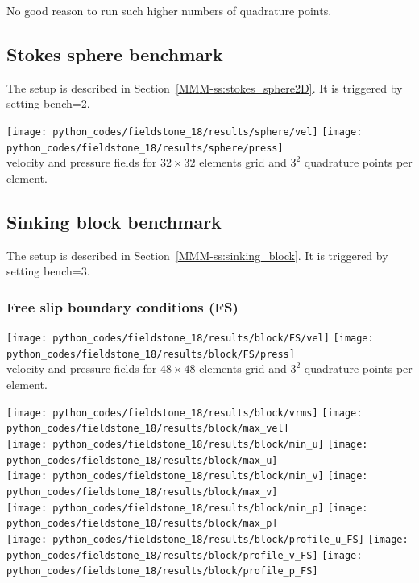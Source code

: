 No good reason to run such higher numbers of quadrature points.


\subsection*{Stokes sphere benchmark}

The setup is described in Section~\ref{MMM-ss:stokes_sphere2D}.
It is triggered by setting {\python bench=2}.

\begin{center}
\texttt{[image: python\_codes/fieldstone\_18/results/sphere/vel]}
\texttt{[image: python\_codes/fieldstone\_18/results/sphere/press]}\\
{\captionfont velocity and pressure fields for $32\times 32$ elements grid and $3^2$
quadrature points per element.}
\end{center}

\subsection*{Sinking block benchmark}

The setup is described in Section~\ref{MMM-ss:sinking_block}.
It is triggered by setting {\python bench=3}.

\subsubsection*{Free slip boundary conditions (FS)}

\begin{center}
\texttt{[image: python\_codes/fieldstone\_18/results/block/FS/vel]}
\texttt{[image: python\_codes/fieldstone\_18/results/block/FS/press]}\\
{\captionfont velocity and pressure fields for $48\times 48$ elements grid and $3^2$
quadrature points per element.}
\end{center}


\begin{center}
\texttt{[image: python\_codes/fieldstone\_18/results/block/vrms]}
\texttt{[image: python\_codes/fieldstone\_18/results/block/max\_vel]}\\
\texttt{[image: python\_codes/fieldstone\_18/results/block/min\_u]}
\texttt{[image: python\_codes/fieldstone\_18/results/block/max\_u]}\\
\texttt{[image: python\_codes/fieldstone\_18/results/block/min\_v]}
\texttt{[image: python\_codes/fieldstone\_18/results/block/max\_v]}\\
\texttt{[image: python\_codes/fieldstone\_18/results/block/min\_p]}
\texttt{[image: python\_codes/fieldstone\_18/results/block/max\_p]}\\
\texttt{[image: python\_codes/fieldstone\_18/results/block/profile\_u\_FS]}
\texttt{[image: python\_codes/fieldstone\_18/results/block/profile\_v\_FS]}
\texttt{[image: python\_codes/fieldstone\_18/results/block/profile\_p\_FS]}
\end{center}

